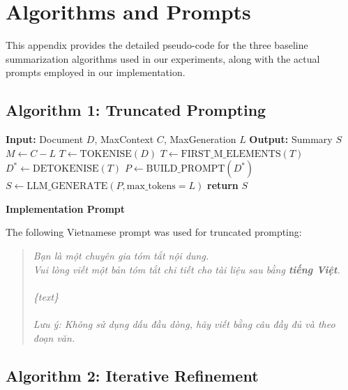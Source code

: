 \documentclass[11pt]{article}
\begin{document}
\appendix

\onecolumn


\section{Algorithms and Prompts}
\label{sec:appendix}

This appendix provides the detailed pseudo-code for the three baseline summarization algorithms used in our experiments, along with the actual prompts employed in our implementation.

\subsection{Algorithm 1: Truncated Prompting}

 
\begin{algorithm}
\caption{Truncated-Prompt Summarisation}
\label{alg:truncated}
\begin{algorithmic}[1]
\State \textbf{Input:} Document $D$, MaxContext $C$, MaxGeneration $L$
\State \textbf{Output:} Summary $S$
\State $M \gets C - L$ 
\State $T \gets \text{TOKENISE}(D)$ 
    \State $T \gets \text{FIRST\_M\_ELEMENTS}(T)$ 
\EndIf
\State $D^* \gets \text{DETOKENISE}(T)$
\State $P \gets \text{BUILD\_PROMPT}(D^*)$ 
\State $S \gets \text{LLM\_GENERATE}(P, \text{max\_tokens}=L)$
\State \textbf{return} $S$
\end{algorithmic}
\end{algorithm}

\textbf{Implementation Prompt}

The following Vietnamese prompt was used for truncated prompting:

\begin{quote}
\textit{Bạn là một chuyên gia tóm tắt nội dung.\\
Vui lòng viết một bản tóm tắt chi tiết cho tài liệu sau bằng \textbf{tiếng Việt}.\\
\\
\{text\}\\
\\
Lưu ý: Không sử dụng dấu đầu dòng, hãy viết bằng câu đầy đủ và theo đoạn văn.}
\end{quote}

\subsection{Algorithm 2: Iterative Refinement}
\end{document}
